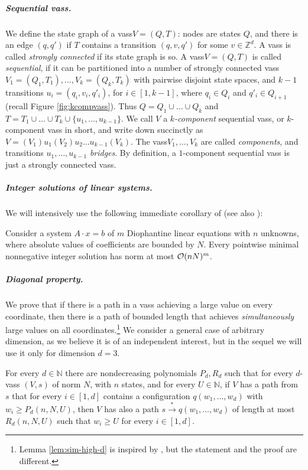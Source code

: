 \documentclass[a4paper, UKenglish, cleveref, autoref, thm-restate]{lipics-v2021}
\newcommand{\N}{\mathbb{N}}
\newcommand{\Z}{\mathbb{Z}}
\newcommand{\trans}[1]{\stackrel{#1}{\longrightarrow}}
\newcommand{\tran}{\trans{*}}
\newcommand{\OO}{{\cal O}}
\newcommand{\vass}{{\sc vass}\xspace}
\newcommand{\parvass}[1]{{$#1$-\vass}\xspace}
\newcommand{\ktvass}{(V_1) u_1 (V_2) u_2 \ldots u_{k-1} (V_k)}
\newcommand{\para}[1]{\vspace{-3mm}\subparagraph*{\bf #1.}}
\newcommand{\setfromto}[2]{[#1, #2]}
\newcommand{\setto}[1]{\setfromto 1 {#1}}
\begin{document}
\para{Sequential \vass}

We define the state graph of a \vass $V = (Q, T)$: nodes are states $Q$, and there is an edge
$(q,q')$ if $T$ contains a transition $(q, v, q')$ for some $v\in\Z^d$.
A \vass is called \emph{strongly connected} if its state graph is so.
A \vass $V = (Q, T)$ is called \emph{sequential},
if it can be partitioned into a number of strongly connected 
\vass $V_1=(Q_1, T_1), \ldots, V_k=(Q_k, T_k)$ with pairwise disjoint state spaces, 
and $k-1$ transitions
$u_i=(q_i, v_i, q'_i)$, for $i\in\setto{k-1}$, where $q_i\in Q_i$ and $q'_i \in Q_{i+1}$
(recall Figure \ref{fig:kcompvass}).
Thus $Q=Q_1\cup\ldots\cup Q_k$ and 
$T=T_1 \cup \ldots \cup T_k \cup \{u_1, \ldots, u_{k-1}\}$.
We call $V$ a \emph{$k$-component} sequential \vass,
or $k$-component \vass in short,
and write down succinctly as 
$
V  =  \ktvass.
$
The \vass $V_1, \ldots, V_k$ are called \emph{components}, and transitions
$u_1, \ldots, u_{k-1}$  \emph{bridges}.
By definition, a $1$-component sequential \vass is just a strongly connected \vass.


\para{Integer solutions of linear systems}
We will intensively use the following immediate corollary of \cite{Pottier91}
(see also \cite[Prop.~4]{taming}):
\begin{lemma}
\label{lem:taming}
Consider a system $A\cdot x = b$ of $m$ Diophantine linear equations with $n$ unknowns,
where absolute values of coefficients are bounded by $N$.
Every pointwise minimal nonnegative integer solution has norm at most
$\OO(nN)^m$.
\end{lemma}


\para{Diagonal property}

We prove that
if there is a path in a \vass achieving a large value on every coordinate,
then there is a path of bounded length that achieves \emph{simultaneously} large values on all coordinates.\footnote{Lemma \ref{lem:sim-high-d} is inspired by \cite[Lemma 4.13]{LS19}, 
but the statement and the proof are different.}
We consider a general case of arbitrary dimension,
as we believe it is of an independent interest, but in the sequel we will use it only for dimension $d = 3$.

\begin{lemma}\label{lem:sim-high-d}
For every $d \in \N$ there are nondecreasing polynomials $P_d, R_d$ such that 
for every \parvass d $(V, s)$ of norm $N$, with $n$ states, and for every $U\in\N$,
if $V$ has a path from $s$ that for every $i\in\setto d$ contains a configuration 
$q(w_1, \ldots, w_d)$ with $w_i \geq P_d(n, N, U)$,
then $V$ has also a path $s \tran q(w_1, \ldots, w_d)$ of length at most $R_d(n, N, U)$
such that $w_i \geq U$ for every $i\in\setto d$.
\end{lemma}
\end{document}
